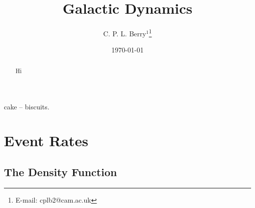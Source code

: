 \documentclass[useAMS,usenatbib]{mn2e}
\title[Galactic Dynamics]{Galactic Dynamics}
\author[C. P. L. Berry]{C. P. L. Berry$^{1}$\thanks{E-mail:
cplb2@cam.ac.uk}}
\begin{document}
\date{\today}

\pagerange{\pageref{firstpage}--\pageref{lastpage}} 

\maketitle

\label{firstpage}

\begin{abstract}
Hi
\end{abstract}

\begin{keywords}
cake -- biscuits.
\end{keywords}

\section{Event Rates}

\subsection{The Density Function}
\end{document}
